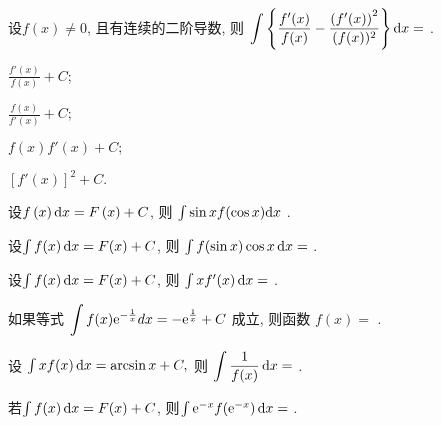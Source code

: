 \begin{problem} 设$f(x) \neq 0$, 且有连续的二阶导数, 则
$\displaystyle \int\left\{ \frac{f'(x)}{f(x)} - \frac{\left( f'(x) \right)^{2}}{(f(x))^{2}} \right\} \mathop{}\!\mathrm{d} x = $ .

\begin{abcd} \item $\displaystyle \frac{f'(x)}{f(x)} + C;$ \item $\displaystyle \frac{f(x)}{f'(x)} + C;$ \item
$\displaystyle f(x)f'(x) + C;$ \item $\displaystyle \left\lbrack f'(x) \right\rbrack^{2} + C.$

\end{abcd}

\end{problem}


\begin{problem} 设$f\left( x \right)\mathop{}\!\mathrm{d} x = F\left( x \right) + C$, 则
$\int\sin x f(\cos x){\d}x$ .

\end{problem}           

\begin{problem} 设$\int f(x)\mathop{}\!\mathrm{d} x = F(x) + C$, 则
$\int f(\sin x)\cos x\mathop{}\!\mathrm{d} x =$ 
.

\end{problem}           

\begin{problem} 设$\int f(x)\mathop{}\!\mathrm{d} x = F(x) + C$, 则 $\int xf'(x)\mathop{}\!\mathrm{d} x =$
.

\end{problem}           

\begin{problem} 如果等式
$\displaystyle \int f(x)\mathrm{e}^{- \frac{1}{x}}dx = - \mathrm{e}^{\frac{1}{x}} + C$ 成立,
则函数 $f(x) =$ .

\end{problem}           

\begin{problem} 设 $\int {xf(x)\mathop{}\!\mathrm{d}x} = \arcsin x + C,$ 则
$\displaystyle \int \frac{1}{f(x)}\mathop{}\!\mathrm{d} x =$ .

\end{problem}           

\begin{problem}
若$\int {f(x)\mathop{}\!\mathrm{d}x= F(x) + C}$, 则$\int {\mathrm{e}^{- x}f(\mathrm{e}^{- x})\mathop{}\!\mathrm{d}x=}$
.

\end{problem}           


